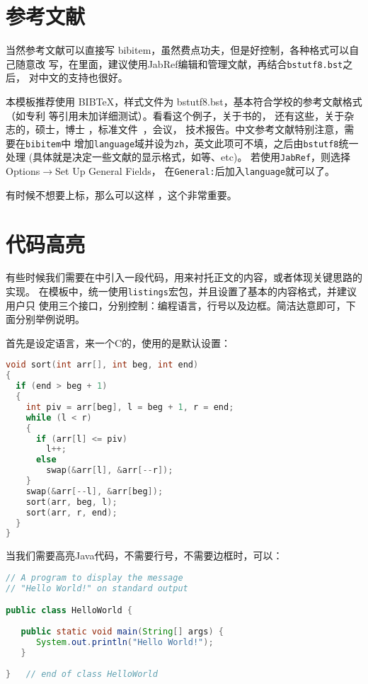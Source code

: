 \section{参考文献}
\label{sec:bib}
当然参考文献可以直接写 bibitem，虽然费点功夫，但是好控制，各种格式可以自己随意改
写，在\scnuthesis{}里面，建议使用JabRef编辑和管理文献，再结合\verb|bstutf8.bst|之后，
对中文的支持也很好。

本模板推荐使用 BIB\TeX，样式文件为 bstutf8.bst，基本符合学校的参考文献格式（如专利
等引用未加详细测试）。看看这个例子，关于书的，
还有这些，关于杂志的，硕士，博士
，标准文件~，会议，%
技术报告。中文参考文献\textsf{特别注意}，需要在\verb|bibitem|中
增加\verb|language|域并设为\verb|zh|，英文此项可不填，之后由\verb|bstutf8|统一处理
(具体就是决定一些文献的显示格式，如等、etc)。
若使用\verb|JabRef|，则选择\textsf{Options}$\rightarrow$\textsf{Set Up General Fields}，
在\verb|General:|后加入\verb|language|就可以了。

有时候不想要上标，那么可以这样 \cite{shaheshang}，这个非常重要。

\section{代码高亮}
有些时候我们需要在中引入一段代码，用来衬托正文的内容，或者体现关键思路的实现。
在模板中，统一使用\texttt{listings}宏包，并且设置了基本的内容格式，并建议用户只
使用三个接口，分别控制：编程语言，行号以及边框。简洁达意即可，下面分别举例说明。

首先是设定语言，来一个C的，使用的是默认设置：
\begin{lstlisting}[language=C]
void sort(int arr[], int beg, int end)
{
  if (end > beg + 1)
  {
    int piv = arr[beg], l = beg + 1, r = end;
    while (l < r)
    {
      if (arr[l] <= piv)
        l++;
      else
        swap(&arr[l], &arr[--r]);
    }
    swap(&arr[--l], &arr[beg]);
    sort(arr, beg, l);
    sort(arr, r, end);
  }
}
\end{lstlisting}

当我们需要高亮Java代码，不需要行号，不需要边框时，可以：
\begin{lstlisting}[language=Java,numbers=none,frame=none]
// A program to display the message
// "Hello World!" on standard output

public class HelloWorld {
 
   public static void main(String[] args) {
      System.out.println("Hello World!");
   }
      
}   // end of class HelloWorld
\end{lstlisting}

